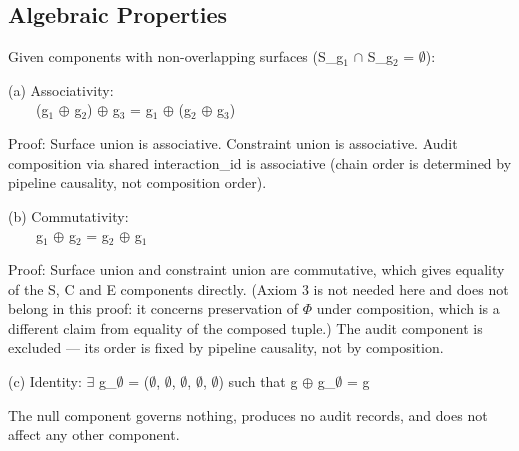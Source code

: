 \subsection{Algebraic Properties}


\begin{clem}
Given components with non-overlapping surfaces (S\_\allowbreak{}g$_1$ $\cap$ S\_\allowbreak{}g$_2$ = $\emptyset$):

\begin{claddisp}
(a) Associativity:\\
~~~~(g$_1$ $\oplus$ g$_2$) $\oplus$ g$_3$ = g$_1$ $\oplus$ (g$_2$ $\oplus$ g$_3$)\\
\end{claddisp}
Proof: Surface union is associative. Constraint union is associative.
Audit composition via shared interaction\_\allowbreak{}id is associative (chain order is determined by pipeline causality, not composition order).

\begin{claddisp}
(b) Commutativity:\\
~~~~g$_1$ $\oplus$ g$_2$ = g$_2$ $\oplus$ g$_1$\\
\end{claddisp}
Proof: Surface union and constraint union are commutative, which gives equality of the S, C and E components directly. (Axiom 3 is not needed here and does not belong in this proof: it concerns preservation of $\Phi$ under composition, which is a different claim from equality of the composed tuple.) The audit component is excluded --- its order is fixed by pipeline causality, not by composition.

(c) Identity: $\exists$ g\_\allowbreak{}$\emptyset$ = ($\emptyset$, $\emptyset$, $\emptyset$, $\emptyset$, $\emptyset$) such that g $\oplus$ g\_\allowbreak{}$\emptyset$ = g

The null component governs nothing, produces no audit records, and does not affect any other component.

\end{clem}


